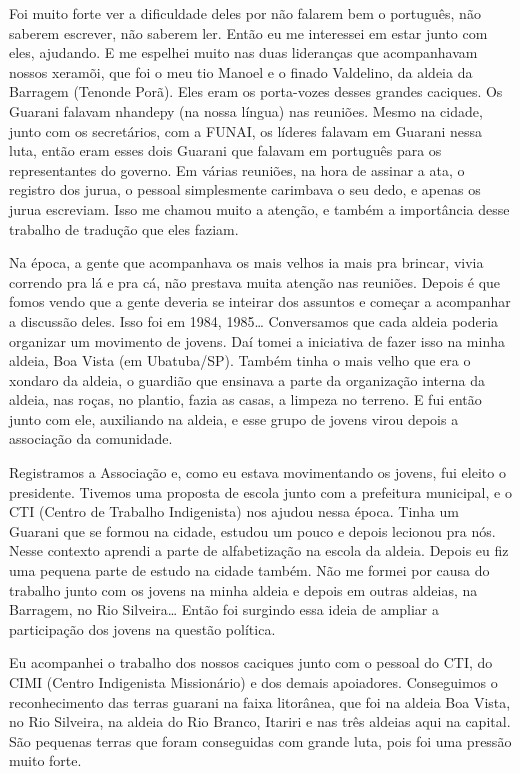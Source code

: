 Foi muito forte ver a dificuldade deles por não falarem bem o português,
não saberem escrever, não saberem ler. Então eu me interessei em estar
junto com eles, ajudando. E me espelhei muito nas duas lideranças que
acompanhavam nossos xeramõi, que foi o meu tio Manoel e o finado
Valdelino, da aldeia da Barragem (Tenonde Porã). Eles eram os
porta-vozes desses grandes caciques. Os Guarani falavam nhandepy (na
nossa língua) nas reuniões. Mesmo na cidade, junto com os secretários,
com a FUNAI, os líderes falavam em Guarani nessa luta, então eram esses
dois Guarani que falavam em português para os representantes do
governo. Em várias reuniões, na hora de assinar a ata, o registro dos
jurua, o pessoal simplesmente carimbava o seu dedo, e apenas os jurua
escreviam. Isso me chamou muito a atenção, e também a importância desse
trabalho de tradução que eles faziam.

Na época, a gente que acompanhava os mais velhos ia mais pra brincar,
vivia correndo pra lá e pra cá, não prestava muita atenção nas
reuniões. Depois é que fomos vendo que a gente deveria se inteirar dos
assuntos e começar a acompanhar a discussão deles. Isso foi em 1984,
1985\ldots{} Conversamos que cada aldeia poderia organizar um movimento de
jovens. Daí tomei a iniciativa de fazer isso na minha aldeia, Boa Vista
(em Ubatuba/SP). Também tinha o mais velho que era o xondaro da aldeia,
o guardião que ensinava a parte da organização interna da aldeia, nas
roças, no plantio, fazia as casas, a limpeza no terreno. E fui então
junto com ele, auxiliando na aldeia, e esse grupo de jovens virou
depois a associação da comunidade.

Registramos a Associação e, como eu estava movimentando os jovens, fui
eleito o presidente. Tivemos uma proposta de escola junto com a
prefeitura municipal, e o CTI (Centro de Trabalho Indigenista) nos
ajudou nessa época. Tinha um Guarani que se formou na cidade, estudou
um pouco e depois lecionou pra nós. Nesse contexto aprendi a parte de
alfabetização na escola da aldeia. Depois eu fiz uma pequena parte de
estudo na cidade também. Não me formei por causa do trabalho junto com
os jovens na minha aldeia e depois em outras aldeias, na Barragem, no
Rio Silveira\ldots{} Então foi surgindo essa ideia de ampliar a participação
dos jovens na questão política.

Eu acompanhei o trabalho dos nossos caciques junto com o pessoal do CTI,
do CIMI (Centro Indigenista Missionário) e dos demais apoiadores.
Conseguimos o reconhecimento das terras guarani na faixa litorânea, que
foi na aldeia Boa Vista, no Rio Silveira, na aldeia do Rio Branco,
Itariri e nas três aldeias aqui na capital. São pequenas terras que
foram conseguidas com grande luta, pois foi uma pressão muito forte. 

